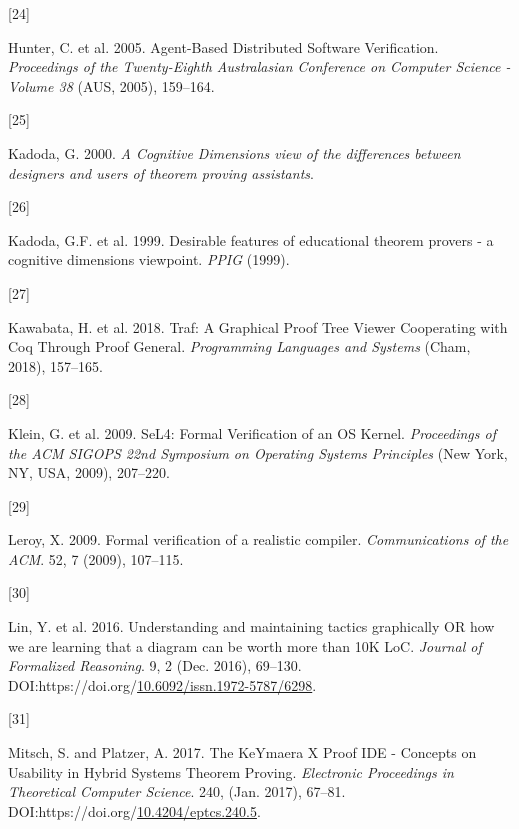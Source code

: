 \documentclass[
]{article}
\newlength{\cslhangindent}
\newlength{\csllabelwidth}
\newlength{\cslentryspacingunit} %
\newenvironment{CSLReferences}[2] %
 {%
  \setlength{\parindent}{0pt}
  \ifodd #1
  \let\oldpar\par
  \def\par{\hangindent=\cslhangindent\oldpar}
  \fi
  \setlength{\parskip}{#2\cslentryspacingunit}
 }%
 {}
\newcommand{\CSLLeftMargin}[1]{\parbox[t]{\csllabelwidth}{#1}}
\newcommand{\CSLRightInline}[1]{\parbox[t]{\linewidth - \csllabelwidth}{#1}\break}
\begin{document}
\begin{CSLReferences}{0}{0}
\leavevmode{}%
\CSLLeftMargin{{[}24{]} }
\CSLRightInline{Hunter, C. et al. 2005. Agent-{Based} {Distributed}
{Software} {Verification}. \emph{Proceedings of the {Twenty}-{Eighth}
{Australasian} {Conference} on {Computer} {Science} - {Volume} 38} (AUS,
2005), 159--164.}

\leavevmode{}%
\CSLLeftMargin{{[}25{]} }
\CSLRightInline{Kadoda, G. 2000. \emph{A {Cognitive} {Dimensions} view
of the differences between designers and users of theorem proving
assistants}.}

\leavevmode{}%
\CSLLeftMargin{{[}26{]} }
\CSLRightInline{Kadoda, G.F. et al. 1999. Desirable features of
educational theorem provers - a cognitive dimensions viewpoint.
\emph{{PPIG}} (1999).}

\leavevmode{}%
\CSLLeftMargin{{[}27{]} }
\CSLRightInline{Kawabata, H. et al. 2018. Traf: {A} {Graphical} {Proof}
{Tree} {Viewer} {Cooperating} with {Coq} {Through} {Proof} {General}.
\emph{Programming {Languages} and {Systems}} (Cham, 2018), 157--165.}

\leavevmode{}%
\CSLLeftMargin{{[}28{]} }
\CSLRightInline{Klein, G. et al. 2009. {SeL4}: {Formal} {Verification}
of an {OS} {Kernel}. \emph{Proceedings of the {ACM} {SIGOPS} 22nd
{Symposium} on {Operating} {Systems} {Principles}} (New York, NY, USA,
2009), 207--220.}

\leavevmode{}%
\CSLLeftMargin{{[}29{]} }
\CSLRightInline{Leroy, X. 2009. Formal verification of a realistic
compiler. \emph{Communications of the ACM}. 52, 7 (2009), 107--115.}

\leavevmode{}%
\CSLLeftMargin{{[}30{]} }
\CSLRightInline{Lin, Y. et al. 2016. Understanding and maintaining
tactics graphically {OR} how we are learning that a diagram can be worth
more than {10K} {LoC}. \emph{Journal of Formalized Reasoning}. 9, 2
(Dec. 2016), 69--130.
DOI:https://doi.org/\href{https://doi.org/10.6092/issn.1972-5787/6298}{10.6092/issn.1972-5787/6298}.}

\leavevmode{}%
\CSLLeftMargin{{[}31{]} }
\CSLRightInline{Mitsch, S. and Platzer, A. 2017. The {KeYmaera} {X}
{Proof} {IDE} - {Concepts} on {Usability} in {Hybrid} {Systems}
{Theorem} {Proving}. \emph{Electronic Proceedings in Theoretical
Computer Science}. 240, (Jan. 2017), 67--81.
DOI:https://doi.org/\href{https://doi.org/10.4204/eptcs.240.5}{10.4204/eptcs.240.5}.}


\end{CSLReferences}
\end{document}
